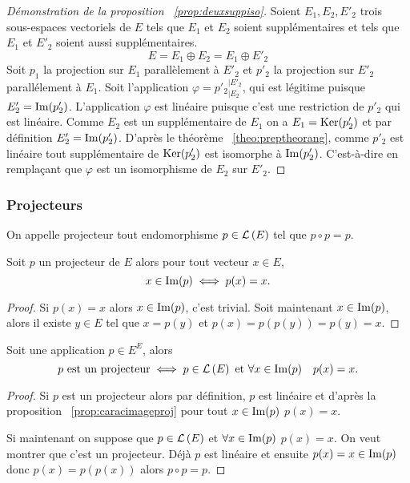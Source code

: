 \begin{proof}[Démonstration de la proposition~
  \ref{prop:deuxsuppiso}]
  Soient \(E_1, E_2, E'_2\) trois sous-espaces vectoriels de \(E\) tels que \(E_1\) et \(E_2\) soient supplémentaires et tels que \(E_1\) et \(E'_2\) soient aussi supplémentaires.
  \begin{equation}
    E=E_1 \oplus E_2 = E_1 \oplus E'_2
  \end{equation}
  Soit \(p_1\) la projection sur \(E_1\) parallèlement à \(E'_2\) et \(p'_2\) la projection sur \(E'_2\) parallélement à \(E_1\). Soit l'application \(\varphi={p'_2}_{|E_2}^{|E'_2}\), qui est légitime puisque \(E'_2=\operatorname{Im}(p'_2)\). L'application \(\varphi\) est linéaire puisque c'est une restriction de \(p'_2\) qui est linéaire. Comme \(E_2\) est un supplémentaire de \(E_1\) on a \(E_1 = \operatorname{Ker}(p'_2)\) et par définition \(E'_2 = \operatorname{Im}(p'_2)\). D'après le théorème~
  \ref{theo:preptheorang}, comme \(p'_2\) est linéaire tout supplémentaire de \(\operatorname{Ker}(p'_2)\) est isomorphe à \(\operatorname{Im}(p'_2)\). C'est-à-dire en remplaçant que \(\varphi\) est un isomorphisme de \(E_2\) sur \(E'_2\).
\end{proof}

\subsubsection{Projecteurs}

\begin{defdef}
  On appelle projecteur tout endomorphisme \(p \in \mathcal{L}\left(E\right)\) tel que \(p \circ p=p\).
\end{defdef}

\begin{prop}\label{prop:caracimageproj}
  Soit \(p\) un projecteur de \(E\) alors pour tout vecteur \(x \in E\),
  \begin{equation}
    x \in \operatorname{Im}(p) \iff p(x)=x.
  \end{equation}
\end{prop}
\begin{proof}
  Si \(p(x)=x\) alors \(x \in \operatorname{Im}(p)\), c'est trivial. Soit maintenant \(x \in \operatorname{Im}(p)\), alors il existe \(y \in E\) tel que \(x=p(y)\) et \(p(x)=p(p(y))=p(y)=x\).
\end{proof}

\begin{prop}
  Soit une application \(p \in E^E\), alors
  \begin{equation}
    p \text{~est un projecteur} \iff p \in \mathcal{L}\left(E\right) \text{~et~} \forall x \in \operatorname{Im}(p) \quad p(x)=x.
  \end{equation}
\end{prop}
\begin{proof}
  Si \(p\) est un projecteur alors par définition, \(p\) est linéaire et d'après la proposition~
  \ref{prop:caracimageproj} pour tout \(x \in \operatorname{Im}(p)\) \(p(x)=x\).

  Si maintenant on suppose que \(p \in \mathcal{L}\left(E\right)\) et \(\forall x \in \operatorname{Im}(p)\) \(p(x)=x\). On veut montrer que c'est un projecteur. Déjà \(p\) est linéaire et ensuite \(p(x)=x \in \operatorname{Im}(p)\) donc \(p(x)=p(p(x))\) alors \(p \circ p=p\).
\end{proof}

